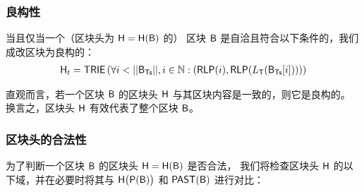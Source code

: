   
\subsubsection{良构性}
\label{sec:internal consistency}
当且仅当一个（区块头为 $\textsf{H}=\textsf{H}(\textsf{B})$ 的） {\name} 区块 $\textsf{B}$ 是自洽且符合以下条件的，我们成改区块为良构的：
\begin{align}
	\head_t = \trie\left(\forall i<||\block_{\txs}||, i\in \N: \left(\rlp(i),\rlp(L_{\tx}(\block_{\txs}[i]))\right) \right)  
\end{align}

直观而言，若一个区块 $\textsf{B}$ 的区块头 $\textsf{H}$ 与其区块内容是一致的，则它是良构的。
换言之，区块头 $\textsf{H}$ 有效代表了整个区块 $\textsf{B}$。




\subsubsection{区块头的合法性}
\label{sec:valid header}

为了判断一个区块 $\textsf{B}$ 的区块头 $\textsf{H}=\textsf{H}(\textsf{B})$ 是否合法，
我们将检查区块头 $\textsf{H}$ 的以下域，并在必要时将其与 $\textsf{H}\big(\mathsf{P}(\textsf{B})\big)$ 和 $\mathsf{PAST}(\textsf{B})$ 进行对比：

